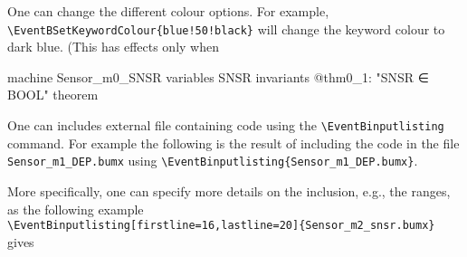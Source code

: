 One can change the different colour options.  For example, \verb|\EventBSetKeywordColour{blue!50!black}| will change the keyword colour to dark blue. (This has effects only when 
\begin{EventBcode}
machine Sensor_m0_SNSR
variables
	SNSR
invariants
	@thm0_1: "SNSR ∈ BOOL" theorem
\end{EventBcode}

One can includes external file containing \EventB code using the \verb|\EventBinputlisting| command.  For example the following is the result of including the code in the file \verb|Sensor_m1_DEP.bumx| using \verb|\EventBinputlisting{Sensor_m1_DEP.bumx}|.

More specifically, one can specify more details on the inclusion, e.g., the ranges, as the following example\\
\verb|\EventBinputlisting[firstline=16,lastline=20]{Sensor_m2_snsr.bumx}|
gives



